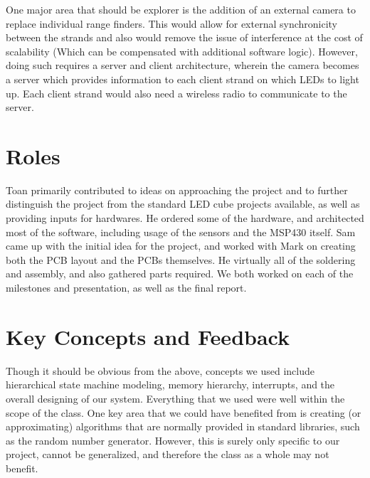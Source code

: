 \documentclass[10pt,titlepage]{article}
\begin{document}
  One major area that should be explorer is the addition of an external camera to replace individual range finders. This would allow for external synchronicity between the strands and also would remove the issue of interference at the cost of scalability (Which can be compensated with additional software logic). However, doing such requires a server and client architecture, wherein the camera becomes a server which provides information to each client strand on which LEDs to light up. Each client strand would also need a wireless radio to communicate to the server. \\

  \section*{Roles}
  Toan primarily contributed to ideas on approaching the project and to further distinguish the project from the standard LED cube projects available, as well as providing inputs for hardwares. He ordered some of the hardware, and architected most of the software, including usage of the sensors and the MSP430 itself. Sam came up with the initial idea for the project, and worked with Mark on creating both the PCB layout and the PCBs themselves. He virtually all of the soldering and assembly, and also gathered parts required. We both worked on each of the milestones and presentation, as well as the final report. \\
  \section*{Key Concepts and Feedback}
  Though it should be obvious from the above, concepts we used include hierarchical state machine modeling, memory hierarchy, interrupts, and the overall designing of our system. Everything that we used were well within the scope of the class. One key area that we could have benefited from is creating (or approximating) algorithms that are normally provided in standard libraries, such as the random number generator. However, this is surely only specific to our project, cannot be generalized, and therefore the class as a whole may not benefit. 
\end{document}
